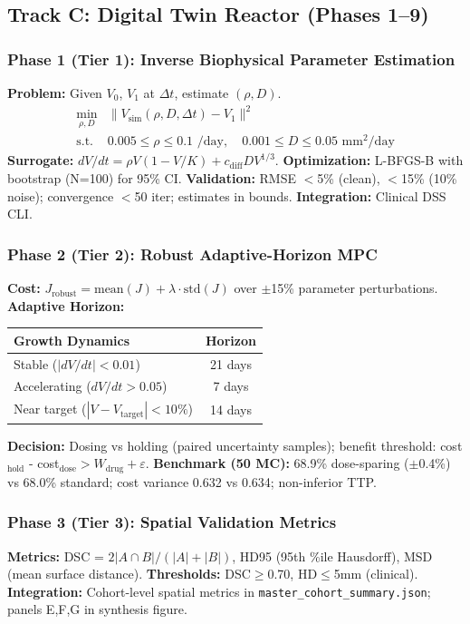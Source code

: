 \documentclass[11pt, twocolumn]{article}
\begin{document}
\subsection{Track C: Digital Twin Reactor (Phases 1--9)}

\subsubsection{Phase 1 (Tier 1): Inverse Biophysical Parameter Estimation}
\textbf{Problem:} Given $V_0$, $V_1$ at $\Delta t$, estimate $(\rho, D)$.
\begin{align}
\min_{\rho,D} & \|V_{\text{sim}}(\rho, D, \Delta t) - V_1\|^2 \\
\text{s.t.} & 0.005 \leq \rho \leq 0.1 \text{ /day}, \quad 0.001 \leq D \leq 0.05 \text{ mm}^2/\text{day}
\end{align}
\textbf{Surrogate:} $dV/dt = \rho V(1-V/K) + c_{\text{diff}} D V^{1/3}$.
\textbf{Optimization:} L-BFGS-B with bootstrap (N=100) for 95\% CI.
\textbf{Validation:} RMSE $<$5\% (clean), $<$15\% (10\% noise); convergence $<$50 iter; estimates in bounds.
\textbf{Integration:} Clinical DSS CLI.

\subsubsection{Phase 2 (Tier 2): Robust Adaptive-Horizon MPC}
\textbf{Cost:} $J_{\text{robust}} = \text{mean}(J) + \lambda \cdot \text{std}(J)$ over $\pm$15\% parameter perturbations.
\textbf{Adaptive Horizon:}
\begin{tabular}{lc}
Growth Dynamics & Horizon \\
\hline
Stable ($|dV/dt|<0.01$) & 21 days \\
Accelerating ($dV/dt>0.05$) & 7 days \\
Near target ($|V-V_{\text{target}}|<10\%$) & 14 days \\
\end{tabular}
\textbf{Decision:} Dosing vs holding (paired uncertainty samples); benefit threshold: cost$_{\text{hold}}$ - cost$_{\text{dose}} > W_{\text{drug}} + \varepsilon$.
\textbf{Benchmark (50 MC):} 68.9\% dose-sparing ($\pm$0.4\%) vs 68.0\% standard; cost variance 0.632 vs 0.634; non-inferior TTP.

\subsubsection{Phase 3 (Tier 3): Spatial Validation Metrics}
\textbf{Metrics:} DSC = $2|A\cap B|/(|A|+|B|)$, HD95 (95th \%ile Hausdorff), MSD (mean surface distance).
\textbf{Thresholds:} DSC$\geq$0.70, HD$\leq$5mm (clinical).
\textbf{Integration:} Cohort-level spatial metrics in \texttt{master\_cohort\_summary.json}; panels E,F,G in synthesis figure.
\end{document}
